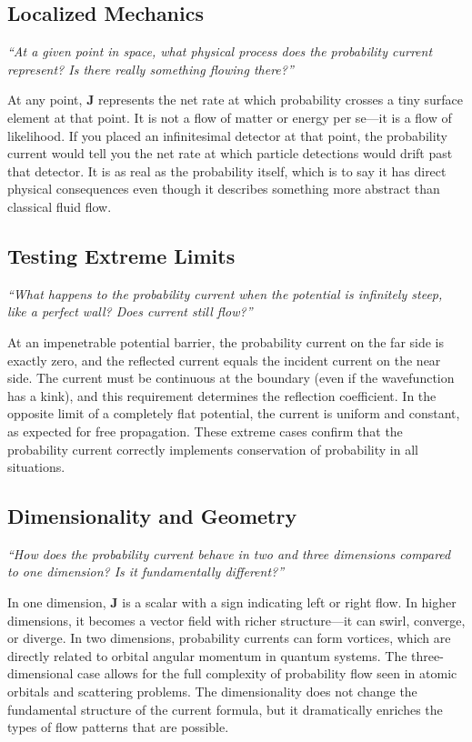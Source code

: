 \documentclass[11pt,openright]{book}
\begin{document}
\subsection*{Localized Mechanics}
\textit{``At a given point in space, what physical process does the probability current represent? Is there really something flowing there?''}

At any point, $\mathbf{J}$ represents the net rate at which probability crosses a tiny surface element at that point. It is not a flow of matter or energy per se---it is a flow of likelihood. If you placed an infinitesimal detector at that point, the probability current would tell you the net rate at which particle detections would drift past that detector. It is as real as the probability itself, which is to say it has direct physical consequences even though it describes something more abstract than classical fluid flow.

\subsection*{Testing Extreme Limits}
\textit{``What happens to the probability current when the potential is infinitely steep, like a perfect wall? Does current still flow?''}

At an impenetrable potential barrier, the probability current on the far side is exactly zero, and the reflected current equals the incident current on the near side. The current must be continuous at the boundary (even if the wavefunction has a kink), and this requirement determines the reflection coefficient. In the opposite limit of a completely flat potential, the current is uniform and constant, as expected for free propagation. These extreme cases confirm that the probability current correctly implements conservation of probability in all situations.

\subsection*{Dimensionality and Geometry}
\textit{``How does the probability current behave in two and three dimensions compared to one dimension? Is it fundamentally different?''}

In one dimension, $\mathbf{J}$ is a scalar with a sign indicating left or right flow. In higher dimensions, it becomes a vector field with richer structure---it can swirl, converge, or diverge. In two dimensions, probability currents can form vortices, which are directly related to orbital angular momentum in quantum systems. The three-dimensional case allows for the full complexity of probability flow seen in atomic orbitals and scattering problems. The dimensionality does not change the fundamental structure of the current formula, but it dramatically enriches the types of flow patterns that are possible.
\end{document}
